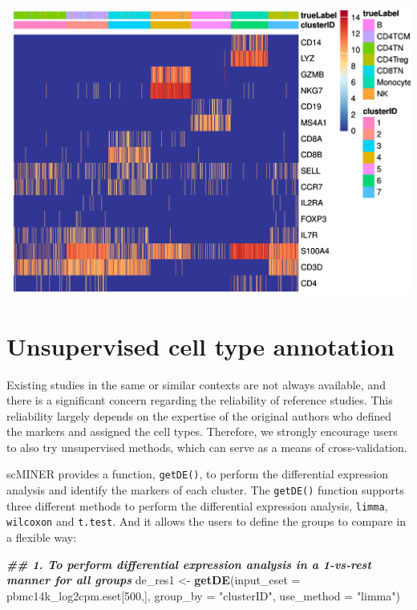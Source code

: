 \documentclass[
  12pt,
]{book}
\newenvironment{Shaded}{\begin{snugshade}}{\end{snugshade}}
\newcommand{\AttributeTok}[1]{\textcolor[rgb]{0.13,0.29,0.53}{#1}}
\newcommand{\DecValTok}[1]{\textcolor[rgb]{0.00,0.00,0.81}{#1}}
\newcommand{\DocumentationTok}[1]{\textcolor[rgb]{0.56,0.35,0.01}{\textbf{\textit{#1}}}}
\newcommand{\FunctionTok}[1]{\textcolor[rgb]{0.13,0.29,0.53}{\textbf{#1}}}
\newcommand{\NormalTok}[1]{#1}
\newcommand{\OtherTok}[1]{\textcolor[rgb]{0.56,0.35,0.01}{#1}}
\newcommand{\StringTok}[1]{\textcolor[rgb]{0.31,0.60,0.02}{#1}}
\begin{document}
\begin{center}\includegraphics{_main_files/figure-latex/featurePlot-heatmap-1} \end{center}

\section{Unsupervised cell type annotation}\label{unsupervised-cell-type-annotation}

Existing studies in the same or similar contexts are not always available, and there is a significant concern regarding the reliability of reference studies. This reliability largely depends on the expertise of the original authors who defined the markers and assigned the cell types. Therefore, we strongly encourage users to also try unsupervised methods, which can serve as a means of cross-validation.

scMINER provides a function, \texttt{getDE()}, to perform the differential expression analysis and identify the markers of each cluster. The \texttt{getDE()} function supports three different methods to perform the differential expression analysis, \texttt{limma}, \texttt{wilcoxon} and \texttt{t.test}. And it allows the users to define the groups to compare in a flexible way:

\begin{Shaded}
\begin{Highlighting}[]
\DocumentationTok{\#\# 1. To perform differential expression analysis in a 1{-}vs{-}rest manner for all groups}
\NormalTok{de\_res1 }\OtherTok{\textless{}{-}} \FunctionTok{getDE}\NormalTok{(}\AttributeTok{input\_eset =}\NormalTok{ pbmc14k\_log2cpm.eset[}\DecValTok{500}\NormalTok{,], }\AttributeTok{group\_by =} \StringTok{"clusterID"}\NormalTok{, }\AttributeTok{use\_method =} \StringTok{"limma"}\NormalTok{)}
\end{Highlighting}
\end{Shaded}
\end{document}
